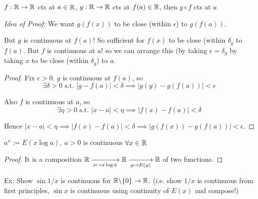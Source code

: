 \begin{theorem}
	$f:\mathbb{R} \to \mathbb{R}$ cts at $a \in \mathbb{R}$, $g:\mathbb{R} \to \mathbb{R}$ cts at $f(a) \in \mathbb{R}$, then $g \circ f$ cts at $a$
\end{theorem}

\emph{Idea of Proof:} We want $g(f(x))$ to be close (within $\epsilon$) to $g(f(a))$. 

But $g$ is continuous at $f(a)$! So sufficient for $f(x)$ to be close (within $\delta_g$ to $f(a)$. But $f$ is continuous at $a$! so we can arrange this (by taking $\epsilon = \delta_g$ by taking $x$ to be close (within $\delta_g$) to $a$. 

\begin{proof}
Fix $\epsilon >0.$ $g$ is continuous at $f(a)$, so \[\exists \delta > 0\text{ s.t. }|g - f(a)| < \delta \implies |g(y) - g(f(a))| < \epsilon\]

Also $f$ is continuous at $a$, so 
\[\exists \eta > 0\text{ s.t. }|x-a| < \eta \implies |f(x) - f(a)| < \delta\]

\noindent Hence $|x-a| < \eta \implies |f(x) - f(a)| < \delta \implies |g(f(x)) - g(f(a))| < \epsilon.$
\end{proof}

\begin{corollary}
$a^x:= E(x\log a), ~a>0$ is continuous $\forall x \in\mathbb{R}$	
\end{corollary}
\begin{proof}
It is a composition $\displaystyle{\ensuremath{\mathbb{R}}\xrightarrow[x \mapsto x\log a]{} \ensuremath{\mathbb{R}}\xrightarrow[y \mapsto E(y)]{} \ensuremath{\mathbb{R}}}$ of two functions.	
\end{proof}

Ex: Show $\sin 1/x$ is continuous for $\mathbb{R}\backslash\{0\} \to \mathbb{R}$. (i.e. show $1/x$ is continuous from first principles, $\sin x$ is continuous using continuity of $E(x)$ and compose!)\vspace*{15pt}

